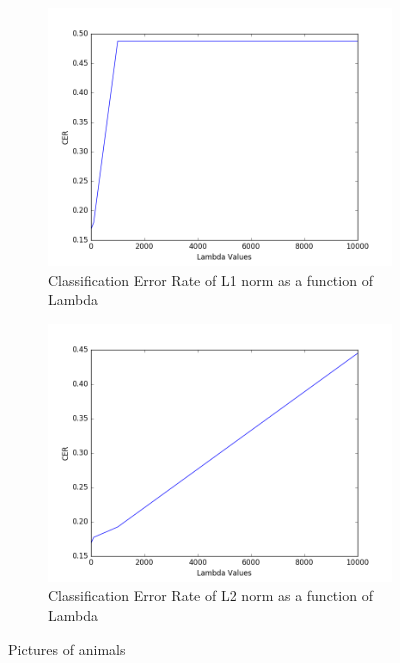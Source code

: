 \documentclass[10pt,twoside]{article}
\begin{document}
\begin{figure}[h]
        \begin{subfigure}[b]{0.5\textwidth}
                \centering
                \includegraphics[width=\linewidth]{Figures/P1/B_CERL1.png}
                \caption{Classification Error Rate of L1 norm as a function of Lambda}
        \end{subfigure}%
        \begin{subfigure}[b]{0.5\textwidth}
                \centering
                \includegraphics[width=\linewidth]{Figures/P1/B_CERL2.png}
                \caption{Classification Error Rate of L2 norm as a function of Lambda}
        \end{subfigure}
        \caption{Pictures of animals}
\end{figure}
\end{document}
